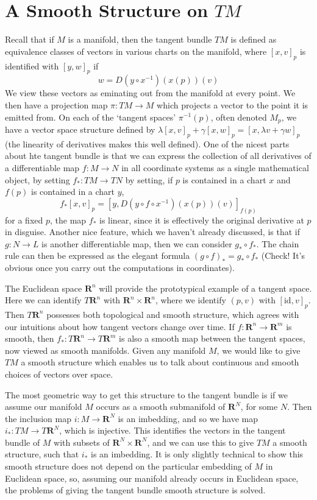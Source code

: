\section{A Smooth Structure on $TM$}

Recall that if $M$ is a manifold, then the tangent bundle $TM$ is defined as equivalence classes of vectors in various charts on the manifold, where $[x,v]_p$ is identified with $[y,w]_p$ if
%
\[ w = D(y \circ x^{-1})(x(p))(v) \]
%
We view these vectors as eminating out from the manifold at every point. We then have a projection map $\pi: TM \to M$ which projects a vector to the point it is emitted from. On each of the `tangent spaces' $\pi^{-1}(p)$, often denoted $M_p$, we have a vector space structure defined by $\lambda [x,v]_p + \gamma [x,w]_p = [x,\lambda v + \gamma w]_p$ (the linearity of derivatives makes this well defined). One of the nicest parts about hte tangent bundle is that we can express the collection of all derivatives of a differentiable map $f: M \to N$ in all coordinate systems as a single mathematical object, by setting $f_*: TM \to TN$ by setting, if $p$ is contained in a chart $x$ and $f(p)$ is contained in a chart $y$,
%
\[ f_*[x,v]_p = \left[ y, D(y \circ f \circ x^{-1})(x(p))(v) \right]_{f(p)} \]
%
for a fixed $p$, the map $f_*$ is linear, since it is effectively the original derivative at $p$ in disguise. Another nice feature, which we haven't already discussed, is that if $g: N \to L$ is another differentiable map, then we can consider $g_* \circ f_*$. The chain rule can then be expressed as the elegant formula $(g \circ f)_* = g_* \circ f_*$ (Check! It's obvious once you carry out the computations in coordinates).

The Euclidean space $\mathbf{R}^n$ will provide the prototypical example of a tangent space. Here we can identify $T\mathbf{R}^n$ with $\mathbf{R}^n \times \mathbf{R}^n$, where we identify $(p,v)$ with $[\text{id}, v]_p$. Then $T\mathbf{R}^n$ possesses both topological and smooth structure, which agrees with our intuitions about how tangent vectors change over time. If $f: \mathbf{R}^n \to \mathbf{R}^m$ is smooth, then $f_*: T\mathbf{R}^n \to T\mathbf{R}^m$ is also a smooth map between the tangent spaces, now viewed as smooth manifolds. Given any manifold $M$, we would like to give $TM$ a smooth structure which enables us to talk about continuous and smooth choices of vectors over space.

The most geometric way to get this structure to the tangent bundle is if we assume our manifold $M$ occurs as a smooth submanifold of $\mathbf{R}^N$, for some $N$. Then the inclusion map $i: M \to \mathbf{R}^N$ is an imbedding, and so we have map $i_*: TM \to T\mathbf{R}^N$, which is injective. This identifies the vectors in the tangent bundle of $M$ with subsets of $\mathbf{R}^N \times \mathbf{R}^N$, and we can use this to give $TM$ a smooth structure, such that $i_*$ is an imbedding. It is only slightly technical to show this smooth structure does not depend on the particular embedding of $M$ in Euclidean space, so, assuming our manifold already occurs in Euclidean space, the problems of giving the tangent bundle smooth structure is solved.

